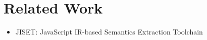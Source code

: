 \section{Related Work}\label{sec:related}

\begin{itemize}
  \item JISET: JavaScript IR-based Semantics Extraction Toolchain~\cite{jiset}
\end{itemize}
